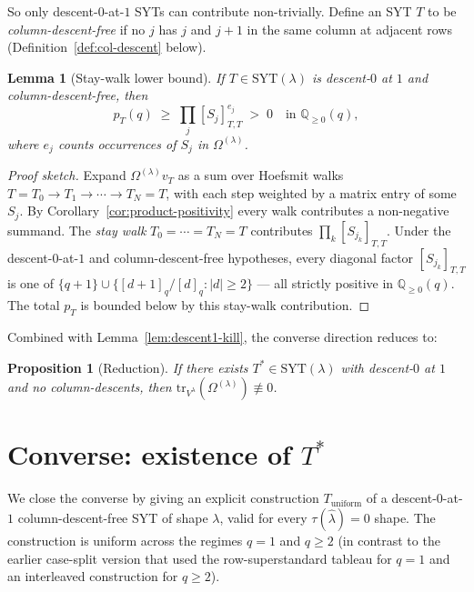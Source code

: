 \documentclass[11pt]{article}
\newtheorem{lemma}[theorem]{Lemma}
\newtheorem{proposition}[theorem]{Proposition}
\theoremstyle{definition}
\newcommand{\Vlam}{V^{\lambda}}
\newcommand{\Om}{\Omega}
\newcommand{\bla}{\widehat\lambda}
\newcommand{\SYT}{\mathrm{SYT}}
\newcommand{\tr}{\mathrm{tr}}
\newcommand{\qint}[1]{[#1]_q}
\newcommand{\Tstar}{T^{*}}
\newcommand{\Tunif}{T_{\mathrm{uniform}}}
\begin{document}
So only descent-$0$-at-$1$ SYTs can contribute non-trivially.  Define an SYT $T$ to be \emph{column-descent-free} if no $j$ has $j$ and $j+1$ in the same column at adjacent rows (Definition~\ref{def:col-descent} below).

\begin{lemma}[Stay-walk lower bound]\label{lem:stay-walk}
If $T \in \SYT(\lambda)$ is descent-$0$ at $1$ and column-descent-free, then
\[
   p_T(q) \;\ge\; \prod_{j} [S_j]_{T,T}^{e_j} \;>\; 0
   \quad\text{in } \mathbb{Q}_{\ge 0}(q),
\]
where $e_j$ counts occurrences of $S_j$ in $\Om^{(\lambda)}$.
\end{lemma}


\begin{proof}[Proof sketch]
Expand $\Om^{(\lambda)} v_T$ as a sum over Hoefsmit walks $T = T_0 \to T_1 \to \cdots \to T_N = T$, with each step weighted by a matrix entry of some $S_j$.  By Corollary~\ref{cor:product-positivity} every walk contributes a non-negative summand.  The \emph{stay walk} $T_0 = \cdots = T_N = T$ contributes $\prod_k [S_{j_k}]_{T,T}$.  Under the descent-$0$-at-$1$ and column-descent-free hypotheses, every diagonal factor $[S_{j_k}]_{T,T}$ is one of $\{q+1\} \cup \{\qint{d+1}/\qint{d} : |d| \ge 2\}$ --- all strictly positive in $\mathbb{Q}_{\ge 0}(q)$.  The total $p_T$ is bounded below by this stay-walk contribution.
\end{proof}

Combined with Lemma~\ref{lem:descent1-kill}, the converse direction reduces to:

\begin{proposition}[Reduction]\label{prop:converse-reduces}
If there exists $\Tstar \in \SYT(\lambda)$ with descent-$0$ at $1$ and no column-descents, then $\tr_{\Vlam}(\Om^{(\lambda)}) \not\equiv 0$.
\end{proposition}

\section{Converse: existence of $T^{*}$}\label{sec:converse-existence}

We close the converse by giving an explicit construction $\Tunif$ of a descent-$0$-at-$1$ column-descent-free SYT of shape $\lambda$, valid for every $\tau(\bla) = 0$ shape.  The construction is uniform across the regimes $q = 1$ and $q \ge 2$ (in contrast to the earlier case-split version that used the row-superstandard tableau for $q = 1$ and an interleaved construction for $q \ge 2$).
\end{document}
